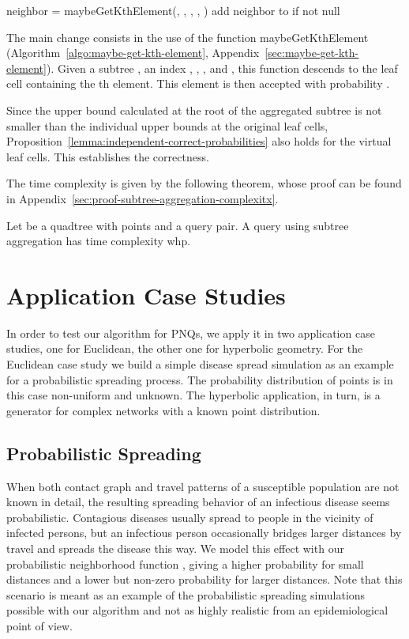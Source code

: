 \documentclass{llncs}
\begin{document}
\begin{algorithm}[H]
  neighbor = maybeGetKthElement(, , , , )\;
  add neighbor to  if not null
\end{algorithm}

The main change consists in the use of the function maybeGetKthElement (Algorithm~\ref{algo:maybe-get-kth-element}, Appendix~\ref{sec:maybe-get-kth-element}).
Given a subtree , an index , , , and , this function descends  to the leaf cell containing the
th element. This element  is then accepted with probability .

Since the upper bound calculated at the root of the aggregated subtree is not smaller than the individual upper bounds at the original leaf cells, Proposition~\ref{lemma:independent-correct-probabilities} also holds for the virtual leaf cells. This establishes the correctness.

The time complexity is given by the following theorem, whose proof can be found in Appendix~\ref{sec:proof-subtree-aggregation-complexitx}.


\begin{theorem}
Let  be a quadtree with  points and  a query pair.
A query  using subtree aggregation has time complexity  whp.
\label{lemma:subtree-aggregation-complexity}
\end{theorem}

\section{Application Case Studies}
\label{sec:applications}
In order to test our algorithm for PNQs, we apply it in two application case studies,
one for Euclidean, the other one for hyperbolic geometry. For the Euclidean case study
we build a simple disease spread simulation as an example for a probabilistic spreading process.
The probability distribution of points is in this case non-uniform and unknown. The hyperbolic application, in turn, is a 
generator for complex networks with a known point distribution. 

\subsection{Probabilistic Spreading}
\label{sub:disease-sim}
When both contact graph and travel patterns of a susceptible population are not known in detail, the resulting spreading behavior of an infectious disease seems probabilistic.
Contagious diseases usually spread to people in the vicinity of infected persons, but an infectious person occasionally bridges larger distances by travel and spreads the disease this way.
We model this effect with our probabilistic neighborhood function , giving a higher probability for small distances and a lower but non-zero probability for larger distances.
Note that this scenario is meant as an example of the probabilistic spreading simulations possible with our algorithm and not as highly realistic from an epidemiological point of view.
\end{document}
